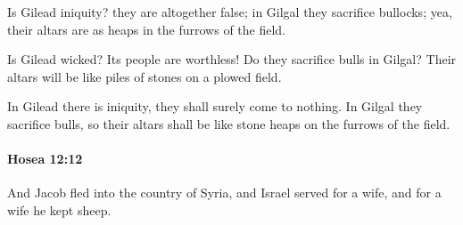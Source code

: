 			\begin{versebox}
					\item[BHS] 
					\item[LXX] 
					\item[ASV] Is Gilead iniquity? they are altogether false; in Gilgal they sacrifice bullocks; yea, their altars are as heaps in the furrows of the field.
					\item[NIV] Is Gilead wicked? Its people are worthless! Do they sacrifice bulls in Gilgal? Their altars will be like piles of stones on a plowed field.
					\item[NRSV] In Gilead there is iniquity, they shall surely come to nothing. In Gilgal they sacrifice bulls, so their altars shall be like stone heaps on the furrows of the field.
			\end{versebox}

		\paragraph{Hosea 12:12} %
			\label{HOSEA-12-12}

			And Jacob fled into the country of Syria, and Israel served for a wife, and for a wife he kept sheep.

